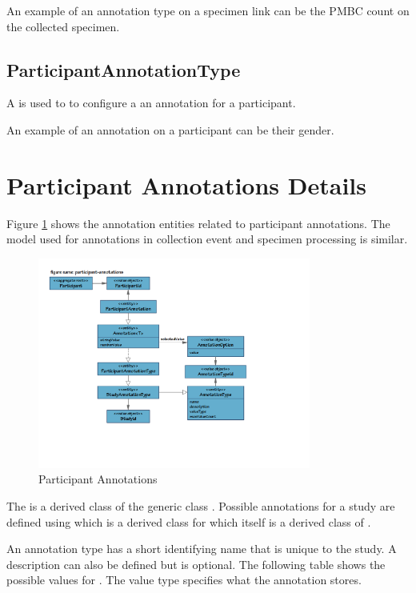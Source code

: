 An example of an annotation type on a specimen link can be the PMBC count on
the collected specimen.

\subsection*{ParticipantAnnotationType}
A  is used to to configure a an
annotation for a participant.

An example of an annotation on a participant can be their gender.

\section{Participant Annotations Details}
Figure \ref{fig-participant-annotations} shows the annotation entities related
to participant annotations. The model used for annotations in collection event
and specimen processing is similar.

\begin{figure}[H]
  \centering
  \includegraphics[trim={10mm 45mm 62mm 18mm}, clip,
    width=0.8\textwidth]{images/participant-annotations}
  \caption{Participant Annotations}
  \label{fig-participant-annotations}
\end{figure}

The  is a derived class of the generic class
. Possible annotations for a study are defined using
 which is a derived class for
 which itself is a derived class of
.

An annotation type has a short identifying name that is unique to the study. A
description can also be defined but is optional. The following table shows the
possible values for . The value type specifies what the
annotation stores.

